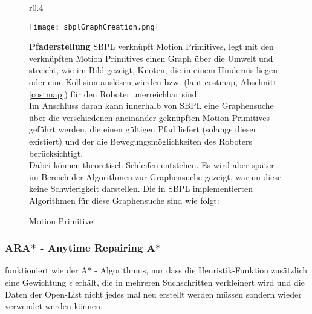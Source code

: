 \documentclass[oribibl]{llncs}
\begin{document}
\begin{figure}
\begin{wrapfigure}[20]{r}{0.4\textwidth}
  \begin{center}
  \vspace{-20pt}
    \texttt{[image: sbplGraphCreation.png]}
    \caption{Motion Primitive}
	\cite{SBPLRosSchool}
  \end{center}
\end{wrapfigure}
\textbf{Pfaderstellung} SBPL verknüpft Motion Primitives, legt mit den verknüpften Motion Primitives einen Graph über die Umwelt und streicht, wie im Bild gezeigt, Knoten, die in einem Hindernis liegen oder eine Kollision auslösen würden bzw. (laut costmap, Abschnitt \ref{costmap}) für den Roboter unerreichbar sind.\\
Im Anschluss daran kann innerhalb von SBPL eine Graphensuche über die verschiedenen aneinander geknüpften Motion Primitives geführt werden, die einen gültigen Pfad liefert (solange dieser existiert) und der die Bewegungsmöglichkeiten des Roboters berücksichtigt.\\
Dabei können theoretisch Schleifen entstehen. Es wird aber später im Bereich der Algorithmen zur Graphensuche gezeigt, warum diese keine Schwierigkeit darstellen.
Die in SBPL implementierten Algorithmen für diese Graphensuche sind wie folgt:\\
\end{figure}
\newpage
\subsubsection{ARA* - Anytime Repairing A*} funktioniert wie der A* - Algorithmus, nur dass die Heuristik-Funktion zusätzlich eine Gewichtung $\epsilon$ erhält, die in mehreren Suchschritten verkleinert wird und die Daten der Open-List nicht jedes mal neu erstellt werden müssen sondern wieder verwendet werden können.\\
\end{document}
